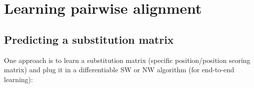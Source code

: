 \documentclass[
  11pt,
  twoside,
  BCOR=10mm,
  listof=totoc]{scrbook}
\begin{document}
\hypertarget{learning-pairwise-alignment}{%
\section{Learning pairwise alignment}\label{learning-pairwise-alignment}}

\hypertarget{predicting-a-substitution-matrix}{%
\subsection{Predicting a substitution matrix}\label{predicting-a-substitution-matrix}}

One approach is to learn a substitution matrix (specific position/position scoring matrix) and plug it in a differentiable SW or NW algorithm (for end-to-end learning):
\end{document}
